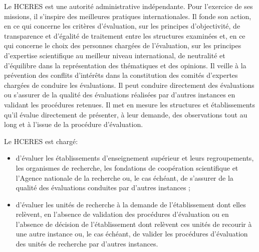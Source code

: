 Le HCERES est une autorit\'e administrative ind\'ependante. 
Pour l'exercice de ses missions, il s'inspire des meilleures pratiques internationales. Il fonde son action, en ce qui concerne les crit\`eres d'\'evaluation, sur les principes d'objectivit\'e, 
de transparence et d'\'egalit\'e de traitement entre les structures examin\'ees et, en ce qui concerne le choix des personnes charg\'ees de l'\'evaluation, sur les principes d'expertise scientifique au meilleur niveau international, 
de neutralit\'e et d'\'equilibre dans la repr\'esentation des th\'ematiques et des opinions. Il veille \`a la pr\'evention des conflits d'int\'er\^ets dans la constitution des comit\'es d'expert\mp e\mp s charg\'e\mp e\mp s de conduire les \'evaluations. 
Il peut conduire directement des \'evaluations ou s'assurer de la qualit\'e des \'evaluations r\'ealis\'ees par d'autres instances en validant les proc\'edures retenues. Il met en mesure les structures et \'etablissements qu'il \'evalue directement de pr\'esenter, 
\`a leur demande, des observations tout au long et \`a l'issue de la proc\'edure d'\'evaluation.

Le HCERES est charg\'e:
\begin{itemize}
\item d'\'evaluer les \'etablissements d'enseignement sup\'erieur et leurs regroupements, les organismes de recherche, les fondations de coop\'eration scientifique et l'Agence nationale de la recherche ou, le cas \'ech\'eant, de s'assurer de la qualit\'e des \'evaluations conduites par d'autres instances ;
\item d'\'evaluer les unit\'es de recherche \`a la demande de l'\'etablissement dont elles rel\`event, en l'absence de validation des proc\'edures d'\'evaluation ou en l'absence de d\'ecision de l'\'etablissement dont rel\`event ces unit\'es de recourir \`a une autre instance ou, le cas \'ech\'eant, 
de valider les proc\'edures d'\'evaluation des unit\'es de recherche par d'autres instances.
\end{itemize}

